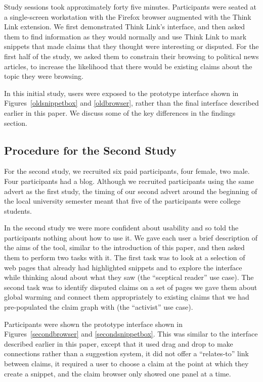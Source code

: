 \documentclass{chi2009}
\newcommand{\todo}[1]{}
\begin{document}
\todo{This was a bad recruiting strategy. We should have recruited people that fitted one of our two personas and then set them tasks that fitted our vision for that persona.}

Study sessions took approximately forty five minutes. Participants were seated at a single-screen workstation with the Firefox browser augmented with the Think Link extension. We first demonstrated Think Link's interface, and then asked them to find information as they would normally and use Think Link to mark snippets that made claims that they thought were interesting or disputed. For the first half of the study, we asked them to constrain their browsing to political news articles, to increase the likelihood that there would be existing claims about the topic they were browsing.

In this initial study, users were exposed to the prototype interface shown in Figures~\ref{oldsnippetbox} and \ref{oldbrowser}, rather than the final interface described earlier in this paper. We discuss some of the key differences in the findings section.

\subsection{Procedure for the Second Study}

For the second study, we recruited six paid participants, four female, two male. Four participants had a blog. Although we recruited participants using the same advert as the first study, the timing of our second advert around the beginning of the local university semester meant that five of the participants were college students. 

In the second study we were more confident about usability and so told the participants nothing about how to use it. We gave each user a brief description of the aims of the tool, similar to the introduction of this paper, and then asked them to perform two tasks with it. The first task was to look at a selection of web pages that already had highlighted snippets and to explore the interface while thinking aloud about what they saw (the ``sceptical reader'' use case). The second task was to identify disputed claims on a set of pages we gave them about global warming and connect them appropriately to existing claims that we had pre-populated the claim graph with (the ``activist'' use case). 

Participants were shown the prototype interface shown in Figures~\ref{secondbrowser} and \ref{secondsnippetbox}. This was similar to the interface described earlier in this paper, except that it used drag and drop to make connections rather than a suggestion system, it did not offer a ``relates-to'' link between claims, it required a user to choose a claim at the point at which they create a snippet, and the claim browser only showed one panel at a time. 
\end{document}

